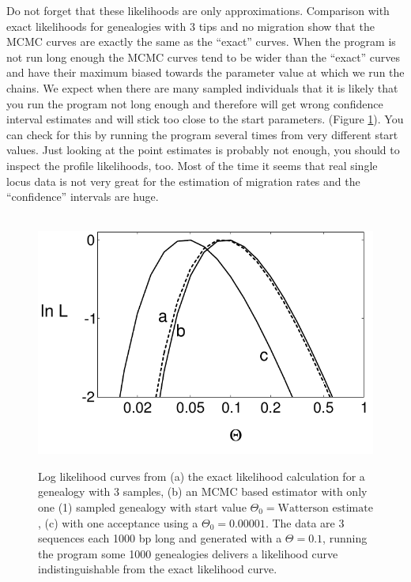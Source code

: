 Do not forget that these likelihoods are only 
approximations. Comparison with exact likelihoods for
genealogies with 3 tips and no migration show that the MCMC curves are
exactly the same as the ``exact'' curves. When the program is not run long 
enough the MCMC curves tend to be wider than the ``exact'' curves and 
have their maximum biased towards the parameter value at which we run the chains. We expect
when there are many sampled individuals that it is likely that you
run the program not long enough and therefore will get wrong confidence
interval estimates and will stick too close to the start parameters.
(Figure \ref{EXACT_MCMC}). 
You can check for this by running the program several
times from very different start values. Just looking at the point estimates
is probably not enough, you should to inspect the profile likelihoods, too.
Most of the time it seems that real single locus data is not very great for
the estimation of migration rates and the ``confidence'' intervals are huge. 
\begin{figure}[htb]
\begin{center}
\leavevmode
\hbox{%
\includegraphics[scale=0.6]{mim/exact_and_mcmc}}
\end{center}
\caption{Log likelihood curves from (a) the exact likelihood 
calculation for a genealogy with 3 samples, (b) an MCMC based estimator
with only one (1) sampled genealogy with start value $\Theta_0=\text{Watterson estimate}$, 
(c) with one acceptance using a $\Theta_0=0.00001$. The data are 3 sequences each
1000 bp long and generated with a $\Theta=0.1$, running the program some 1000
genealogies delivers a likelihood curve indistinguishable from the exact likelihood curve.
\label{EXACT_MCMC}}
\end{figure}

